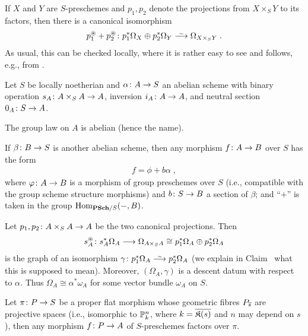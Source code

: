 \documentclass[a4paper,parskip=half,numbers=enddot, DIV=12]{scrreprt}
\begin{document}
If $X$ and $Y$ are $S$-preschemes and $p_1,p_2$ denote the projections from $X\times_SY$ to its factors, then there is a canonical isomorphism
\begin{align}\lbl{eq:p1p2Omega}
	p_1^\oast+p_2^\oast\colon p_1^*\Omega_X\oplus p_2^*\Omega_Y\isomorphism \Omega_{X\times_SY}\;.
\end{align}
As usual, this can be checked locally, where it is rather easy to see and follows, e.g., from \cite[Corollary~16.5]{eisenbudCommAlg}.
\begin{thm}
	Let $S$ be locally noetherian and $\alpha\colon A\morphism S$ an abelian scheme with binary operation $s_A\colon A\times_SA\morphism A$, inversion $i_A\colon A\morphism A$, and neutral section $0_A\colon S\morphism A$.
	\begin{alphanumerate}
		\item The group law on $A$ is abelian (hence the name).
		\item If $\beta\colon B\morphism S$ is another abelian scheme, then any morphism $f\colon A\morphism B$ over $S$ has the form
		\begin{align*}
			f=\phi+b\alpha\;,
		\end{align*}
		where $\phi\colon A\morphism B$ is a morphism of group preschemes over $S$ (i.e., compatible with the group scheme structure morphisms) and $b\colon S\morphism B$ a section of $\beta$; and ``$+$'' is taken in the group $\Hom_{\cat{PSch}/S}(-,B)$.
		\item Let $p_1,p_2\colon A\times_SA\morphism A$ be the two canonical projections. Then
		\begin{align*}
			s_A^\oast\colon s_A^*\Omega_A\morphism \Omega_{A\times_SA}\cong p_1^*\Omega_A\oplus p_2^*\Omega_A
		\end{align*}
		is the graph of an isomorphism $\gamma\colon p_1^*\Omega_A\isomorphism p_2^*\Omega_A$ (we explain in Claim~ what this is supposed to mean). Moreover, $(\Omega_A,\gamma)$ is a descent datum with respect to $\alpha$. Thus $\Omega_A\cong \alpha^*\omega_A$ for some vector bundle $\omega_A$ on $S$.
		\item Let $\pi\colon P\morphism S$ be a proper flat morphism whose geometric fibres $P_{\overline{s}}$ are projective spaces (i.e., isomorphic to $\mathbb{P}_k^n$, where $k=\overline{{\mathfrak{K}(s)}}$ and $n$ may depend on $s$), then any morphism $f\colon P\morphism A$ of $S$-preschemes factors over $\pi$.
	\end{alphanumerate}
\end{thm}
\end{document}
